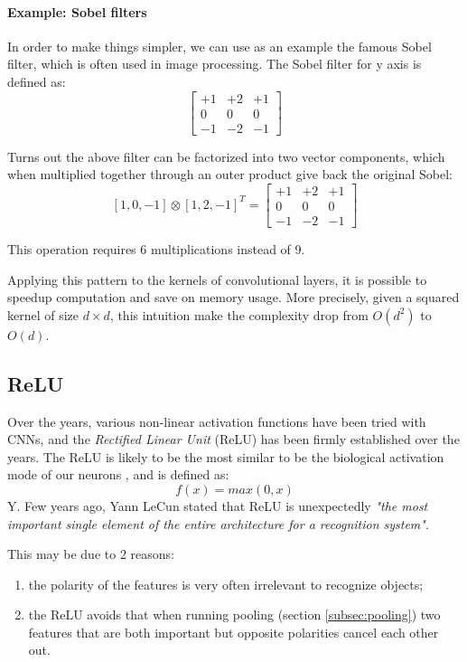 \paragraph{Example: Sobel filters}
In order to make things simpler, we can use as an example the famous Sobel filter, which is often used in image processing. 
The Sobel filter for y axis is defined as: 
\begin{equation}
    \begin{bmatrix}
 +1&  +2& +1\\ 
 0& 0& 0\\ 
 -1&  -2& -1
\end{bmatrix}
\end{equation}

Turns out the above filter can be factorized into two vector components, which when multiplied together through an outer product give back the original Sobel:
$$
\label{eq:separable-sobel}    
[1,0,-1] \otimes [1,2,-1]^{T}= \begin{bmatrix}
 +1&  +2& +1\\ 
  0& 0& 0\\ 
 -1&  -2& -1
\end{bmatrix}

$$

This operation requires 6 multiplications instead of 9. 
\newline 

Applying this pattern to the kernels of convolutional layers, it is possible to speedup computation and save on memory usage. More precisely, given a squared kernel of size $d \times d$, this intuition make the complexity drop from $O(d^2)$ to $ O(d)$. 
\newline 


\subsection{ReLU}
 Over the years, various non-linear activation functions have been tried with CNNs, and the \emph{Rectified Linear Unit} (ReLU) has been firmly established over the years. The ReLU is likely to be the most similar to be the biological activation mode of our neurons \parencite{Relu}, and is defined as: $$f(x)=max(0,x)$$Y. Few years ago, Yann LeCun stated that ReLU is unexpectedly \emph{"the most important single element of the entire architecture for a recognition system"}. 
 
 This may be due to 2 reasons:
 \begin{enumerate}
     \item the polarity of the features is very often irrelevant to recognize objects;
     
     \item the ReLU avoids that when running pooling (section \ref{subsec:pooling}) two features that are both important but opposite polarities cancel each other out.
     
\end{enumerate}


